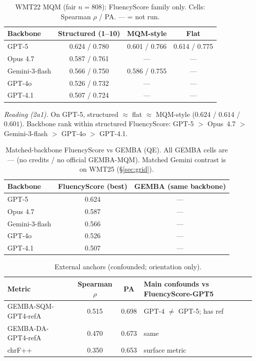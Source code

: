 \documentclass[11pt]{article}
\newcommand{\FS}{FluencyScore}
\begin{document}
\begin{table}[t]
\centering
\scriptsize
\caption{WMT22 MQM (fair $n{=}808$): \FS{} family only. Cells: Spearman $\rho$ / PA. --- = not run.}
\label{tab:2a1}
\begin{tabularx}{\columnwidth}{>{\raggedright\arraybackslash}Xccc}
\toprule
Backbone & Structured (1--10) & MQM-style & Flat \\
\midrule
GPT-5 & 0.624 / 0.780 & 0.601 / 0.766 & 0.614 / 0.775 \\
Opus 4.7 & 0.587 / 0.761 & --- & --- \\
Gemini-3-flash & 0.566 / 0.750 & 0.586 / 0.755 & --- \\
GPT-4o & 0.526 / 0.732 & --- & --- \\
GPT-4.1 & 0.507 / 0.724 & --- & --- \\
\bottomrule
\end{tabularx}

\end{table}


\textit{Reading (2a1).}
On GPT-5, structured ${\approx}$ flat ${\approx}$ MQM-style
($0.624$ / $0.614$ / $0.601$).
Backbone rank within structured \FS{}:
GPT-5 $>$ Opus~4.7 $>$ Gemini-3-flash $>$ GPT-4o $>$ GPT-4.1.

\begin{table}[t]
\centering
\scriptsize
\caption{Matched-backbone \FS{} vs GEMBA (QE). All GEMBA cells are --- (no credits / no official GEMBA-MQM). Matched Gemini contrast is on WMT25 (\S\ref{sec:grid}).}
\label{tab:2a2}
\begin{tabularx}{\columnwidth}{>{\raggedright\arraybackslash}Xcc}
\toprule
Backbone & \FS{} (best) & GEMBA (same backbone) \\
\midrule
GPT-5 & 0.624 & --- \\
Opus 4.7 & 0.587 & --- \\
Gemini-3-flash & 0.566 & --- \\
GPT-4o & 0.526 & --- \\
GPT-4.1 & 0.507 & --- \\
\bottomrule
\end{tabularx}

\end{table}

\begin{table}[t]
\centering
\scriptsize
\caption{External anchors (confounded; orientation only).}
\label{tab:2a3}
\begin{tabularx}{\columnwidth}{>{\raggedright\arraybackslash}Xcc>{\raggedright\arraybackslash}X}
\toprule
Metric & Spearman $\rho$ & PA & Main confounds vs \FS{}-GPT5 \\
\midrule
GEMBA-SQM-GPT4-refA & 0.515 & 0.698 & GPT-4 $\neq$ GPT-5; has ref \\
GEMBA-DA-GPT4-refA & 0.470 & 0.673 & same \\
chrF++ & 0.350 & 0.653 & surface metric \\
\bottomrule
\end{tabularx}

\end{table}
\end{document}
